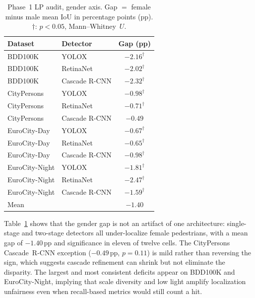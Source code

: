 \documentclass[runningheads]{llncs}
\begin{document}
\begin{table}[!ht]
\caption{Phase~1 LP audit, gender axis. Gap $=$ female minus male mean IoU in
percentage points (pp). $\dagger$: $p<0.05$, Mann--Whitney~$U$.}
\label{tab:gender}
\centering
\setlength{\tabcolsep}{5pt}
\begin{tabular}{llc}
\toprule
Dataset & Detector & Gap (pp) \\
\midrule
BDD100K & YOLOX & $-2.16^\dagger$ \\
BDD100K & RetinaNet & $-2.02^\dagger$ \\
BDD100K & Cascade R-CNN & $-2.32^\dagger$ \\
CityPersons & YOLOX & $-0.98^\dagger$ \\
CityPersons & RetinaNet & $-0.71^\dagger$ \\
CityPersons & Cascade R-CNN & $-0.49$ \\
EuroCity-Day & YOLOX & $-0.67^\dagger$ \\
EuroCity-Day & RetinaNet & $-0.65^\dagger$ \\
EuroCity-Day & Cascade R-CNN & $-0.98^\dagger$ \\
EuroCity-Night & YOLOX & $-1.81^\dagger$ \\
EuroCity-Night & RetinaNet & $-2.47^\dagger$ \\
EuroCity-Night & Cascade R-CNN & $-1.59^\dagger$ \\
\midrule
\multicolumn{2}{l}{Mean} & $-1.40$ \\
\bottomrule
\end{tabular}
\end{table}

Table~\ref{tab:gender} shows that the gender gap is not an artifact of one
architecture: single-stage and two-stage detectors all under-localize female
pedestrians, with a mean gap of $-1.40$\,pp and significance in eleven of twelve
cells. The CityPersons Cascade~R-CNN exception ($-0.49$\,pp, $p=0.11$) is mild
rather than reversing the sign, which suggests cascade refinement can shrink but
not eliminate the disparity. The largest and most consistent deficits appear on
BDD100K and EuroCity-Night, implying that scale diversity and low light amplify
localization unfairness even when recall-based metrics would still count a hit.
\end{document}
